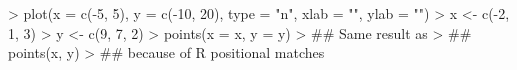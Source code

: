 \begin{Schunk}
\begin{Sinput}
> plot(x = c(-5, 5), y = c(-10, 20), type = "n", xlab = "", ylab = "")
> x <- c(-2, 1, 3)
> y <- c(9, 7, 2)
> points(x = x, y = y)
> ## Same result as
> ## points(x, y)
> ## because of R positional matches
\end{Sinput}
\end{Schunk}

